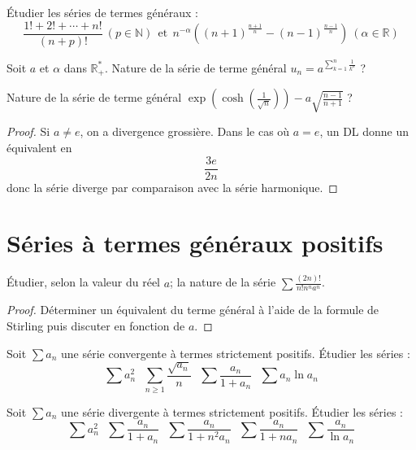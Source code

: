 \documentclass[french,a4paper]{article}
\newcommand{\N}{\mathbb{N}}
\newcommand{\R}{\mathbb{R}}
\newcommand{\st}{^*}
\theoremstyle{plain}
\theoremstyle{definition}
\theoremstyle{remark}
\begin{document}
\begin{ex}{}
	Étudier les séries de termes généraux : $$\frac{1!+2!+\cdots+n!}{(n+p)!}\ (p\in\N)\ \ \text{et}\ \ n^{-\alpha}\left((n+1)^{\frac{n+1}{n}}-(n-1)^{\frac{n-1}{n}}\right)\ (\alpha\in\R)$$
\end{ex}

\begin{ex}{}
	Soit $a$ et $\alpha$ dans $\R_+\st$. Nature de la série de terme général $u_n=\displaystyle a^{\sum_{k=1}^{n}\frac{1}{k^\alpha}}$ ?
\end{ex}

\begin{ex}{}
	Nature de la série de terme général $\displaystyle\exp\left(\cosh\left(\frac{1}{\sqrt{n}}\right)\right)-a\sqrt{\frac{n-1}{n+1}}$ ?
\end{ex}
\begin{proof}
	Si $a\ne e$, on a divergence grossière. Dans le cas où $a=e$, un DL donne un équivalent en $$\frac{3e}{2n}$$ donc la série diverge par comparaison avec la série harmonique.
\end{proof}

\section{Séries à termes généraux positifs}

\begin{ex}{}
	Étudier, selon la valeur du réel $a$; la nature de la série $\displaystyle\sum\frac{(2n)!}{n!n^na^n}$.
\end{ex}
\begin{proof}
	Déterminer un équivalent du terme général à l'aide de la formule de Stirling puis discuter en fonction de $a$.
\end{proof}

\begin{ex}{}
	Soit $\sum a_n$ une série convergente à termes strictement positifs. Étudier les séries :
	$$\sum a_n^2\ \ \ \sum_{n\geqslant 1}\frac{\sqrt{a_n}}{n}\ \ \ \sum\frac{a_n}{1+a_n}\ \ \ \sum a_n\ln a_n$$
\end{ex}

\begin{ex}{}
	Soit $\sum a_n$ une série divergente à termes strictement positifs. Étudier les séries :
	$$\sum a_n^2\ \ \ \sum\frac{a_n}{1+a_n}\ \ \ \sum\frac{a_n}{1+n^2a_n}\ \ \ \sum \frac{a_n}{1+na_n}\ \ \ \sum\frac{a_n}{\ln a_n}$$
\end{ex}
\end{document}
